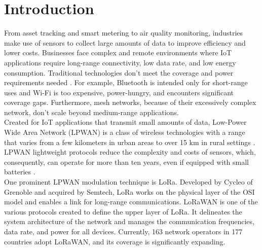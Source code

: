 \chapter{Introduction}
\lettrine[lines=2, findent=3pt, nindent=0pt]{F}{}rom asset tracking and smart metering to air quality monitoring, industries make use of sensors to collect large amounts of data to improve efficiency and lower costs. Businesses face complex and remote environments where IoT applications require long-range connectivity, low data rate, and low energy consumption. Traditional technologies don't meet the coverage and power requirements needed \cite{MEKKI20191}. For example, Bluetooth is intended only for short-range uses and Wi-Fi is too expensive, power-hungry, and encounters significant coverage gaps. Furthermore, mesh networks, because of their excessively complex network, don't scale beyond medium-range applications.
\\
Created for IoT applications that transmit small amounts of data, Low-Power Wide Area Network (LPWAN) is a class of wireless technologies with a range that varies from a few kilometers in urban areas to over 15 km in rural settings \cite{7721743}. LPWAN lightweight protocols reduce the complexity and costs of sensors, which, consequently, can operate for more than ten years, even if equipped with small batteries \cite{s20174794}. 
\\
One prominent LPWAN modulation technique is LoRa. Developed by Cycleo of Grenoble and acquired by Semtech, LoRa works on the physical layer of the OSI model and enables a link for long-range communications. LoRaWAN is one of the various protocols created to define the upper layer of LoRa. It delineates the system architecture of the network and manages the communication frequencies, data rate, and power for all devices. Currently, 163 network operators in 177 countries \cite{coverage} adopt LoRaWAN, and its coverage is significantly expanding.

